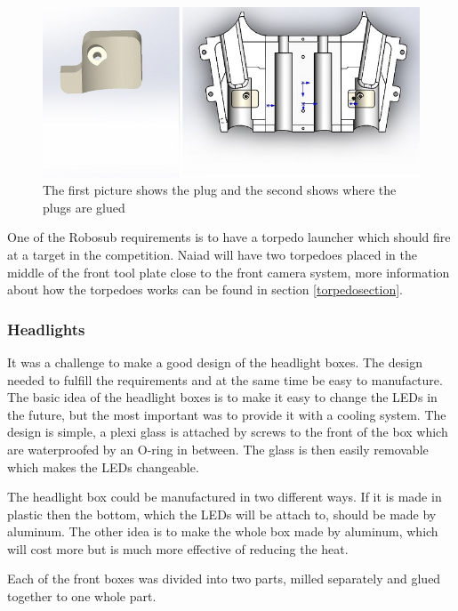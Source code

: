 	\begin{figure}[!ht]
		\begin{center}
			\includegraphics[width=150mm]{./Images/Mechanics/ftplug.jpg}
			\caption{The first picture shows the plug and the second shows where the plugs are glued}
			\label{plug}
		\end{center}
	\end{figure}
	
One of the Robosub requirements is to have a torpedo launcher which should fire at a target in the competition. Naiad will have two torpedoes placed in the middle of the front tool plate close to the front camera system, more information about how the torpedoes works can be found in section \ref{torpedosection}.

	\subsubsection{Headlights}

It was a challenge to make a good design of the headlight boxes. The design needed to fulfill the requirements and at the same time be easy to manufacture. The basic idea of the headlight boxes is to make it easy to change the LEDs in the future, but the most important was to provide it with a cooling system. The design is simple, a plexi glass is attached by screws to the front of the box which are waterproofed by an O-ring in between. The glass is then easily removable which makes the LEDs changeable.

The headlight box could be manufactured in two different ways. If it is made in plastic then the bottom,  which the LEDs will be attach to, should be made by aluminum. The other idea is to make the whole box made by aluminum, which will cost more but is much more effective of reducing the heat. 

Each of the front boxes was divided into two parts, milled separately and glued together to one whole part. 


